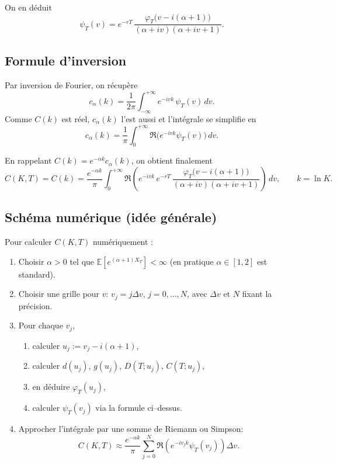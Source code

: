 \documentclass[11pt,a4paper]{article}
\newcommand{\1}{\mathbf{1}}
\begin{document}
On en d\'eduit
\begin{equation}
\boxed{
\psi_T(v)
= e^{-rT}\,
  \frac{\varphi_T\big(v - i(\alpha+1)\big)}
       {(\alpha+iv)(\alpha+iv+1)}.
}
\end{equation}

\subsection{Formule d'inversion}

Par inversion de Fourier, on r\'ecup\`ere
\begin{equation}
c_\alpha(k) = \frac{1}{2\pi}
\int_{-\infty}^{+\infty} e^{-ivk}\,\psi_T(v)\,dv.
\end{equation}
Comme $C(k)$ est r\'eel, $c_\alpha(k)$ l'est aussi et l'int\'egrale se
simplifie en
\begin{equation}
c_\alpha(k) =
\frac{1}{\pi}
\int_0^{+\infty} \Re\!\bigl(e^{-ivk}\psi_T(v)\bigr)\,dv.
\end{equation}

En rappelant $C(k) = e^{-\alpha k} c_\alpha(k)$, on obtient finalement
\begin{equation}
\boxed{
C(K,T)
= C(k)
= \frac{e^{-\alpha k}}{\pi}
  \int_0^{+\infty}
  \Re\!\left(
    e^{-ivk}\,
    e^{-rT}\,
    \frac{\varphi_T\big(v - i(\alpha+1)\big)}
         {(\alpha+iv)(\alpha+iv+1)}
  \right)\,dv,
\qquad k=\ln K.
}
\end{equation}

\subsection{Sch\'ema num\'erique (id\'ee g\'en\'erale)}

Pour calculer $C(K,T)$ num\'eriquement :

\begin{enumerate}
\item Choisir $\alpha>0$ tel que
      $\mathbb{E}[e^{(\alpha+1)X_T}]<\infty$ (en pratique $\alpha\in[1,2]$
      est standard).
\item Choisir une grille pour $v$: $v_j = j\Delta v$, $j=0,\dots,N$, avec
      $\Delta v$ et $N$ fixant la pr\'ecision.
\item Pour chaque $v_j$,
      \begin{enumerate}
      \item calculer $u_j := v_j - i(\alpha+1)$,
      \item calculer $d(u_j)$, $g(u_j)$, $D(T;u_j)$, $C(T;u_j)$,
      \item en d\'eduire $\varphi_T(u_j)$,
      \item calculer $\psi_T(v_j)$ via la formule ci--dessus.
      \end{enumerate}
\item Approcher l'int\'egrale par une somme de Riemann ou Simpson:
      \[
      C(K,T) \approx
      \frac{e^{-\alpha k}}{\pi}
      \sum_{j=0}^N
      \Re\!\left( e^{-i v_j k} \psi_T(v_j) \right)\Delta v.
      \]
\end{enumerate}
\end{document}
